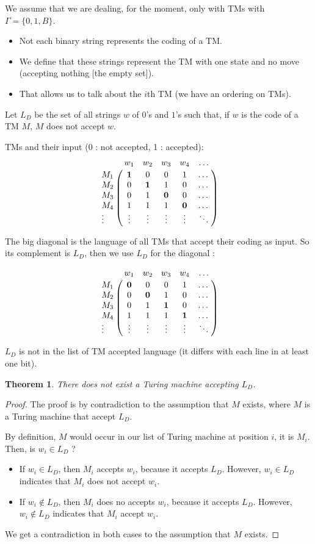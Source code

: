 \documentclass[a4paper,11pt]{report}
\newtheorem{theorem}{Theorem}
\begin{document}
We assume that we are dealing, for the moment, only with TMs with $\Gamma =
\{0,1,B\}$.

\begin{itemize}
\item Not each binary string represents the coding of a TM.
\item We define that these strings represent the TM with one state and no move
  (accepting nothing [the empty set]).
\item That allows us to talk about the $i$th TM (we have an ordering on TMs).
\end{itemize}

Let $L_D$ be the set of all strings $w$ of $0$'s and $1$'s such that, if $w$ is
the code of a TM $M$, $M$ does not accept $w$.

TMs and their input ($0$ : not accepted, 1 : accepted):
\[
  \bordermatrix{%
    & w_1 & w_2 & w_3 & w_4 & \dots \cr
    M_1 & \textbf{1}   & 0   & 0   & 1   & \dots \cr 
    M_2 & 0   & \textbf{1}   & 1   & 0   & \dots \cr 
    M_3 & 0   & 1   & \textbf{0}   & 0   & \dots \cr 
    M_4 & 1   & 1   & 1   & \textbf{0}   & \dots \cr
    \vdots & \vdots & \vdots & \vdots   & \vdots   & \ddots
  }
\]

The big diagonal is the language of all TMs that accept their coding as input.
So its complement is $L_D$, then we use $L_D$ for the diagonal :

\[
  \bordermatrix{%
    & w_1 & w_2 & w_3 & w_4 & \dots \cr
    M_1 & \textbf{0}   & 0   & 0   & 1   & \dots \cr 
    M_2 & 0   & \textbf{0}   & 1   & 0   & \dots \cr 
    M_3 & 0   & 1   & \textbf{1}   & 0   & \dots \cr 
    M_4 & 1   & 1   & 1   & \textbf{1}   & \dots \cr
    \vdots & \vdots & \vdots & \vdots   & \vdots   & \ddots
  }
\]

$L_D$ is not in the list of TM accepted language (it differs with each line in
at least one bit).

\begin{theorem}
  There does not exist a Turing machine accepting $L_D$.
\end{theorem}

\begin{proof}
  The proof is by contradiction to the assumption that $M$ exists, where $M$ is
  a Turing machine that accept $L_D$.

  By definition, $M$ would occur in our list of Turing machine at position $i$,
  it is $M_i$. Then, is $w_i \in L_D$ ?

  \begin{itemize}
  \item If $w_i \in L_D$, then $M_i$ accepts $w_i$, because it accepts $L_D$.
    However, $w_i \in  L_D$ indicates that $M_i$ does not accept $w_i$.
  \item If $w_i \not\in L_D$, then $M_i$ does no accepts $w_i$, because it accepts $L_D$.
    However, $w_i \not\in  L_D$ indicates that $M_i$ accept $w_i$.
  \end{itemize}

  We get a contradiction in both cases to the assumption that $M$ exists.
\end{proof}
\end{document}

